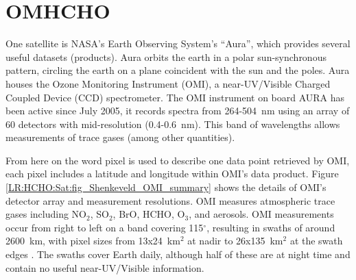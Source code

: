 \section{OMHCHO}
\label{Model:omhcho}
  
  One satellite is NASA's Earth Observing System's ``Aura'', which provides several useful datasets (products).
  Aura orbits the earth in a polar sun-synchronous pattern, circling the earth on a plane coincident with the sun and the poles.
  Aura houses the Ozone Monitoring Instrument (OMI), a near-UV/Visible Charged Coupled Device (CCD) spectrometer.
  The OMI instrument on board AURA has been active since July 2005, it records spectra from 264-504~nm using an array of 60 detectors with mid-resolution (0.4-0.6~nm).
  This band of wavelengths allows measurements of trace gases (among other quantities).
  
  
  From here on the word pixel is used to describe one data point retrieved by OMI, each pixel includes a latitude and longitude within OMI's data product.
  Figure \ref{LR:HCHO:Sat:fig_Shenkeveld_OMI_summary} shows the details of OMI's detector array and measurement resolutions.
  OMI measures atmospheric trace gases including NO$_2$, SO$_2$, BrO, HCHO, O$_3$, and aerosols.
  OMI measurements occur from right to left on a band covering 115$^{\circ}$, resulting in swaths of around 2600~km, with pixel sizes from 13x24~km$^2$ at nadir to 26x135~km$^2$ at the swath edges \parencite{Abad2015}.
  The swaths cover Earth daily, although half of these are at night time and contain no useful near-UV/Visible information.
  
  
  
